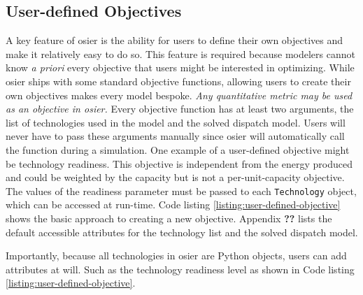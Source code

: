 \subsection{User-defined Objectives}

A key feature of \ac{osier} is the ability for users to define their own objectives and make it relatively easy to do so. This feature is required because modelers cannot know \textit{a priori} every objective that users might be interested in optimizing. While
\ac{osier} ships with some standard objective functions, allowing users to create their own objectives makes every model bespoke. \textit{Any quantitative metric may be used as an objective in \ac{osier}.} Every objective function has at least two arguments, the list of technologies used in the model and the solved dispatch model. Users will never have to pass these arguments manually since \ac{osier} will automatically call the function during a simulation. 
One example of a user-defined objective might be technology readiness. This
objective is independent from the energy produced and could be weighted by the capacity but is not a per-unit-capacity objective. The values of the readiness parameter must be passed to each \texttt{Technology} object, which can 
be accessed at run-time. 
Code listing \ref{listing:user-defined-objective}
shows the basic approach to creating a new objective. Appendix \textbf{??} 
lists the default accessible attributes for the technology list and the solved
dispatch model.

\noindent
Importantly, because all technologies in \ac{osier} are Python objects, 
users can add attributes at will. Such as the technology readiness level as shown
in Code listing \ref{listing:user-defined-objective}. 

